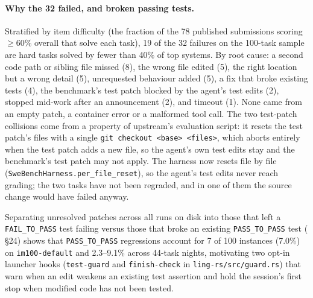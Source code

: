 \documentclass[11pt]{article}
\newcommand{\code}[1]{\texttt{#1}}
\begin{document}
\paragraph{Why the 32 failed, and broken passing tests.} Stratified by item difficulty (the fraction
of the 78 published submissions scoring $\ge 60\%$ overall that solve each task), 19 of the 32
failures on the 100-task sample are hard tasks solved by fewer than 40\% of top systems. By root
cause: a second code path or sibling file missed (8), the wrong file edited (5), the right location
but a wrong detail (5), unrequested behaviour added (5), a fix that broke existing tests (4), the
benchmark's test patch blocked by the agent's test edits (2), stopped mid-work after an
announcement (2), and timeout (1). None came from an empty patch, a container error or a malformed
tool call. The two test-patch collisions come from a property of
upstream's evaluation script: it resets the test patch's files with a single
\code{git checkout <base> <files>}, which aborts entirely when the test patch adds a new file, so
the agent's own test edits stay and the benchmark's test patch may not apply. The harness now resets
file by file (\code{SweBenchHarness.per\_file\_reset}), so the agent's test edits never reach
grading; the two tasks have not been regraded, and in one of them the source change would have
failed anyway.

Separating unresolved patches across all runs on disk into those that left a \code{FAIL\_TO\_PASS}
test failing versus those that broke an existing \code{PASS\_TO\_PASS} test (
\S24) shows that \code{PASS\_TO\_PASS} regressions account for 7 of 100 instances (7.0\%) on
\code{im100-default} and 2.3--9.1\% across 44-task nights, motivating two opt-in launcher hooks (\code{test-guard} and
\code{finish-check} in \code{ling-rs/src/guard.rs}) that warn when an edit weakens an existing test
assertion and hold the session's first stop when modified code has not been tested.
\end{document}
